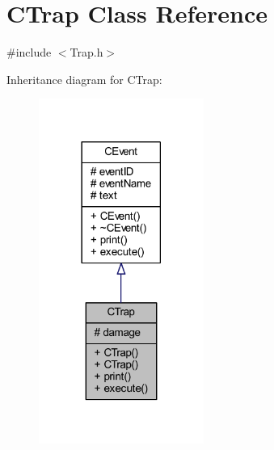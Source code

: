 \hypertarget{class_c_trap}{}\section{C\+Trap Class Reference}
\label{class_c_trap}


{\ttfamily \#include $<$Trap.\+h$>$}



Inheritance diagram for C\+Trap\+:\nopagebreak
\begin{figure}[H]
\begin{center}
\leavevmode
\includegraphics[width=153pt]{class_c_trap__inherit__graph}
\end{center}
\end{figure}


